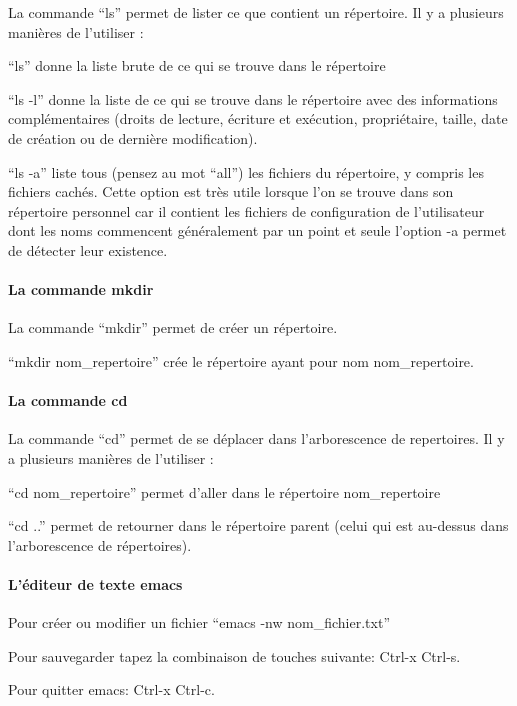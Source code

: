 \documentclass{article}
\begin{document}
    La commande ``ls'' permet de lister ce que contient un répertoire. Il y
a plusieurs manières de l'utiliser :

``ls'' donne la liste brute de ce qui se trouve dans le répertoire

``ls -l'' donne la liste de ce qui se trouve dans le répertoire avec des
informations complémentaires (droits de lecture, écriture et exécution,
propriétaire, taille, date de création ou de dernière modification).

``ls -a'' liste tous (pensez au mot ``all'') les fichiers du répertoire,
y compris les fichiers cachés. Cette option est très utile lorsque l'on
se trouve dans son répertoire personnel car il contient les fichiers de
configuration de l'utilisateur dont les noms commencent généralement par
un point et seule l'option -a permet de détecter leur existence.

    \paragraph{La commande mkdir}\label{la-commande-mkdir}

    La commande ``mkdir'' permet de créer un répertoire.

``mkdir nom\_repertoire'' crée le répertoire ayant pour nom
nom\_repertoire.

    \paragraph{La commande cd}\label{la-commande-cd}

    La commande ``cd'' permet de se déplacer dans l'arborescence de
repertoires. Il y a plusieurs manières de l'utiliser :

``cd nom\_repertoire'' permet d'aller dans le répertoire nom\_repertoire

``cd ..'' permet de retourner dans le répertoire parent (celui qui est
au-dessus dans l'arborescence de répertoires).

    \paragraph{L'éditeur de texte emacs}\label{luxe9diteur-de-texte-emacs}

    Pour créer ou modifier un fichier ``emacs -nw nom\_fichier.txt''

Pour sauvegarder tapez la combinaison de touches suivante: Ctrl-x
Ctrl-s.

Pour quitter emacs: Ctrl-x Ctrl-c.
\end{document}
